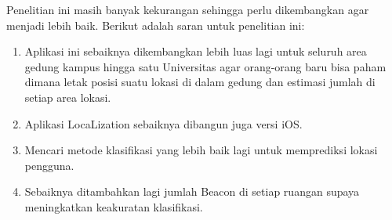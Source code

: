 Penelitian ini masih banyak kekurangan sehingga perlu dikembangkan agar menjadi lebih baik. Berikut adalah saran untuk penelitian ini:
\begin{enumerate}
	\item Aplikasi ini sebaiknya dikembangkan lebih luas lagi untuk seluruh area gedung kampus hingga satu Universitas agar orang-orang baru bisa paham dimana letak posisi suatu lokasi di dalam gedung dan estimasi jumlah di setiap area lokasi.
	\item Aplikasi LocaLization sebaiknya dibangun juga  versi iOS.
	\item Mencari metode klasifikasi yang lebih baik lagi untuk memprediksi lokasi pengguna.
	\item Sebaiknya ditambahkan lagi jumlah Beacon di setiap ruangan supaya meningkatkan keakuratan klasifikasi.

\end{enumerate}

\fancyhf{}
\fancyfoot[R]{\thepage}
\begin{comment}

\end{comment}
